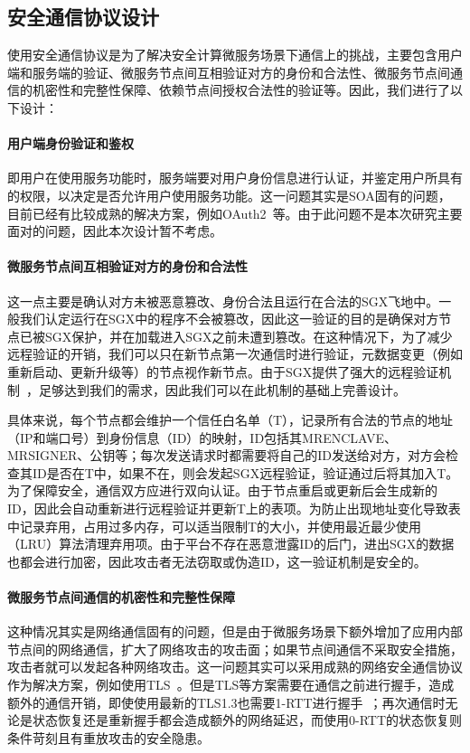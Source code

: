 \subsection{安全通信协议设计}

使用安全通信协议是为了解决安全计算微服务场景下通信上的挑战，主要包含用户端和服务端的验证、微服务节点间互相验证对方的身份和合法性、微服务节点间通信的机密性和完整性保障、依赖节点间授权合法性的验证等。因此，我们进行了以下设计：

\paragraph{用户端身份验证和鉴权}
即用户在使用服务功能时，服务端要对用户身份信息进行认证，并鉴定用户所具有的权限，以决定是否允许用户使用服务功能。这一问题其实是SOA固有的问题，目前已经有比较成熟的解决方案，例如OAuth2~\cite{oauth2spec}等。由于此问题不是本次研究主要面对的问题，因此本次设计暂不考虑。

\paragraph{微服务节点间互相验证对方的身份和合法性}
这一点主要是确认对方未被恶意篡改、身份合法且运行在合法的SGX飞地中。一般我们认定运行在SGX中的程序不会被篡改，因此这一验证的目的是确保对方节点已被SGX保护，并在加载进入SGX之前未遭到篡改。在这种情况下，为了减少远程验证的开销，我们可以只在新节点第一次通信时进行验证，元数据变更（例如重新启动、更新升级等）的节点视作新节点。由于SGX提供了强大的远程验证机制~\cite{intel-sgx-ra}，足够达到我们的需求，因此我们可以在此机制的基础上完善设计。

具体来说，每个节点都会维护一个信任白名单（T），记录所有合法的节点的地址（IP和端口号）到身份信息（ID）的映射，ID包括其MRENCLAVE、MRSIGNER、公钥等；每次发送请求时都需要将自己的ID发送给对方，对方会检查其ID是否在T中，如果不在，则会发起SGX远程验证，验证通过后将其加入T。为了保障安全，通信双方应进行双向认证。由于节点重启或更新后会生成新的ID，因此会自动重新进行远程验证并更新T上的表项。为防止出现地址变化导致表中记录弃用，占用过多内存，可以适当限制T的大小，并使用最近最少使用（LRU）算法清理弃用项。由于平台不存在恶意泄露ID的后门，进出SGX的数据也都会进行加密，因此攻击者无法窃取或伪造ID，这一验证机制是安全的。

\paragraph{微服务节点间通信的机密性和完整性保障}
这种情况其实是网络通信固有的问题，但是由于微服务场景下额外增加了应用内部节点间的网络通信，扩大了网络攻击的攻击面；如果节点间通信不采取安全措施，攻击者就可以发起各种网络攻击。这一问题其实可以采用成熟的网络安全通信协议作为解决方案，例如使用TLS~\cite{8446}。但是TLS等方案需要在通信之前进行握手，造成额外的通信开销，即使使用最新的TLS1.3也需要1-RTT进行握手~\cite{8446}；再次通信时无论是状态恢复还是重新握手都会造成额外的网络延迟，而使用0-RTT的状态恢复则条件苛刻且有重放攻击的安全隐患。

